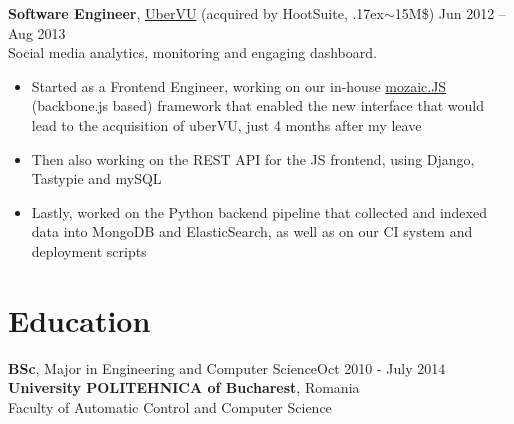 \documentclass[line, margin]{resume}
\newcommand{\bettertilde}{\raise.17ex\hbox{$\scriptstyle\mathtt{\sim}$}}
\begin{document}
\begin{resume}
\textbf{Software Engineer}, \href{http://ubervu.com}{UberVU} (acquired by HootSuite, \bettertilde15M\$) \hfill Jun 2012 -- Aug 2013\\
Social media analytics, monitoring and engaging dashboard.
\begin{itemize} \itemsep -2pt  %
	\item Started as a Frontend Engineer, working on our in-house \href{https://github.com/uberVU/mozaic/}{mozaic.JS} (backbone.js based) framework that enabled the new interface that would lead to the acquisition of uberVU, just 4 months after my leave
    \item Then also working on the REST API for the JS frontend, using Django, Tastypie and mySQL
    \item Lastly, worked on the Python backend pipeline that collected and indexed data into MongoDB and ElasticSearch, as well as on our CI system and deployment scripts
\end{itemize}



    \section{Education}


    \textbf{BSc}, Major in Engineering and Computer Science\hfill Oct 2010 - July 2014\\
    \textbf{University POLITEHNICA of Bucharest}, Romania\\
    Faculty of Automatic Control and Computer Science


\end{resume}
\end{document}
